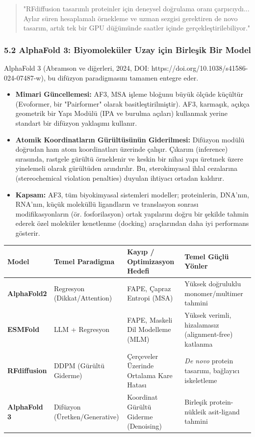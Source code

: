 \documentclass[11pt,a4paper]{article}
\begin{document}
\begin{quote}
"RFdiffusion tasarımlı proteinler için deneysel doğrulama oranı çarpıcıydı... Aylar süren hesaplamalı örnekleme ve uzman sezgisi gerektiren de novo tasarım, artık tek bir GPU düğümünde saatler içinde gerçekleştirilebiliyor."
\end{quote}
\subsubsection{5.2 AlphaFold 3: Biyomoleküler Uzay için Birleşik Bir Model}
AlphaFold 3 (Abramson ve diğerleri, 2024, DOI: https://doi.org/10.1038/s41586-024-07487-w), bu difüzyon paradigmasını tamamen entegre eder.

\begin{itemize}
  \item \textbf{Mimari Güncellemesi:} AF3, MSA işleme bloğunu büyük ölçüde küçültür (Evoformer, bir "Pairformer" olarak basitleştirilmiştir). AF3, karmaşık, açıkça geometrik bir Yapı Modülü (IPA ve burulma açıları) kullanmak yerine standart bir difüzyon yaklaşımı kullanır.
  \item \textbf{Atomik Koordinatların Gürültüsünün Giderilmesi:} Difüzyon modülü doğrudan ham atom koordinatları üzerinde çalışır. Çıkarım (inference) sırasında, rastgele gürültü örneklenir ve keskin bir nihai yapı üretmek üzere yinelemeli olarak gürültüden arındırılır. Bu, sterokimyasal ihlal cezalarına (stereochemical violation penalties) duyulan ihtiyacı ortadan kaldırır.
  \item \textbf{Kapsam:} AF3, tüm biyokimyasal sistemleri modeller; proteinlerin, DNA'nın, RNA'nın, küçük moleküllü ligandların ve translasyon sonrası modifikasyonların (ör. fosforilasyon) ortak yapılarını doğru bir şekilde tahmin ederek özel moleküler kenetlenme (docking) araçlarından daha iyi performans gösterir.
\end{itemize}
\begin{longtable}{>{\raggedright\arraybackslash}p{}>{\raggedright\arraybackslash}p{}>{\raggedright\arraybackslash}p{}>{\raggedright\arraybackslash}p{}}
\toprule
\textbf{Model} & \textbf{Temel Paradigma} & \textbf{Kayıp / Optimizasyon Hedefi} & \textbf{Temel Güçlü Yönler} \\
\midrule
\endhead
\textbf{AlphaFold2} & Regresyon (Dikkat/Attention) & FAPE, Çapraz Entropi (MSA) & Yüksek doğruluklu monomer/multimer tahmini \\
\textbf{ESMFold} & LLM + Regresyon & FAPE, Maskeli Dil Modelleme (MLM) & Yüksek verimli, hizalamasız (alignment-free) katlanma \\
\textbf{RFdiffusion} & DDPM (Gürültü Giderme) & Çerçeveler Üzerinde Ortalama Kare Hatası & \textit{De novo} protein tasarımı, bağlayıcı iskeletleme \\
\textbf{AlphaFold 3} & Difüzyon (Üretken/Generative) & Koordinat Gürültü Giderme (Denoising) & Birleşik protein-nükleik asit-ligand tahmini \\
\bottomrule
\end{longtable}
\end{document}

